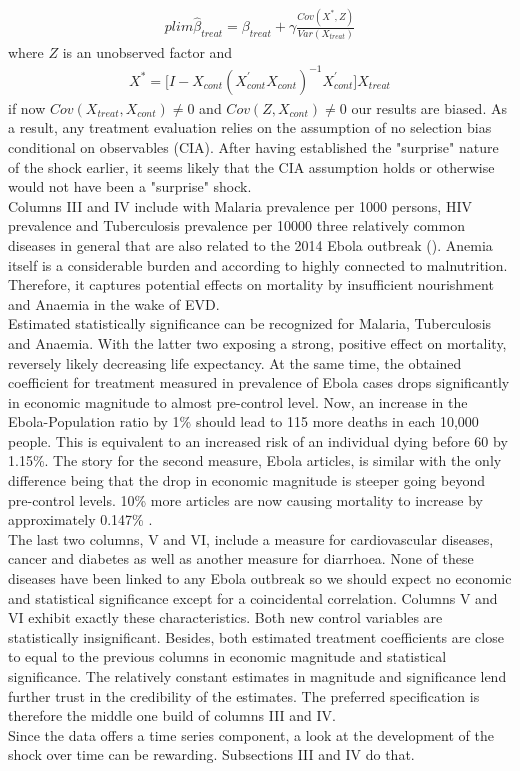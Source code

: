 \documentclass{article}
\begin{document}
\begin{align*}
plim \widehat{\beta}_{treat} = \beta_{treat} + \gamma \frac{Cov(X^*,Z)}{Var(X_{treat})}
\end{align*} 
where $Z$ is an unobserved factor and 
\begin{align*}
X^* = \big[ I - X_{cont}(X^{'}_{cont} X_{cont})^{-1} X^{'}_{cont} \big] X_{treat}
\end{align*}
if now $Cov(X_{treat}, X_{cont}) \neq 0$ and $Cov(Z, X_{cont}) \neq 0$ our results are biased. As a result, any treatment evaluation relies on the assumption of no selection bias conditional on observables (CIA). After having established the "surprise" nature of the shock earlier, it seems likely that the CIA assumption holds or otherwise would not have been a "surprise" shock.\\
Columns III and IV include with Malaria prevalence per 1000 persons, HIV prevalence and Tuberculosis prevalence per 10000 three relatively common diseases in general that are also related to the 2014 Ebola outbreak (\cite{parpia2016effects}). Anemia itself is a considerable burden and according to \cite{ehrhardt2006malaria} highly connected to malnutrition. Therefore, it captures potential effects on mortality by insufficient nourishment and Anaemia in the wake of EVD. \\
Estimated statistically significance can be recognized for Malaria, Tuberculosis and Anaemia. With the latter two exposing a strong, positive effect on mortality, reversely likely decreasing life expectancy. At the same time, the obtained coefficient for treatment measured in prevalence of Ebola cases drops significantly in economic magnitude to almost pre-control level. Now, an increase in the Ebola-Population ratio by 1\% should lead to 115 more deaths in each 10,000 people. This is equivalent to an increased risk of an individual dying before 60 by 1.15\%. 
The story for the second measure, Ebola articles, is similar with the only difference being that the drop in economic magnitude is steeper going beyond pre-control levels. 10\% more articles are now causing mortality to increase by approximately 0.147\% .\\
The last two columns, V and VI, include a measure for cardiovascular diseases, cancer and diabetes as well as another measure for diarrhoea. None of these diseases have been linked to any Ebola outbreak so we should expect no economic and statistical significance except for a coincidental correlation. Columns V and VI exhibit exactly these characteristics. Both new control variables are statistically insignificant. Besides, both estimated treatment coefficients are close to equal to the previous columns in economic magnitude and statistical significance. The relatively constant estimates in magnitude and significance lend further trust in the credibility of the estimates. The preferred specification is therefore the middle one build of columns III and IV. \\
Since the data offers a time series component, a look at the development of the shock over time can be rewarding. Subsections III and IV do that.
\end{document}
